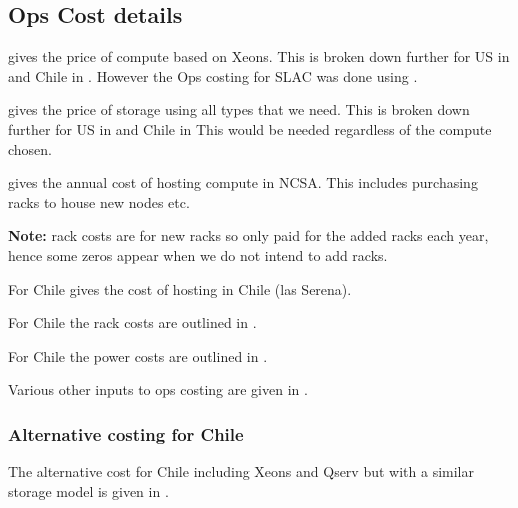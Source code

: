 \subsection{Ops Cost details}\label{sec:opsdetails}
 gives the price of compute based on Xeons.
This is broken down further for US in  and Chile in .
However the Ops costing for SLAC was done using .

 gives the price of storage using all  types that we need.
This is broken down further for US in  and Chile in 
This would be needed regardless of the compute chosen.









 gives the annual cost of hosting compute in NCSA. This includes purchasing racks to house
new nodes etc.

{\bf Note:} rack costs are for new racks so only paid for the added racks each year, hence some zeros appear when we do not intend to add racks.

For Chile  gives the cost of hosting in Chile (las Serena).


For Chile the rack costs are outlined in .


For Chile the power costs are outlined in .


Various other inputs to ops costing are given in .



\subsubsection{Alternative costing for Chile}
The alternative cost for Chile including Xeons and Qserv but with a similar storage model is given in .

